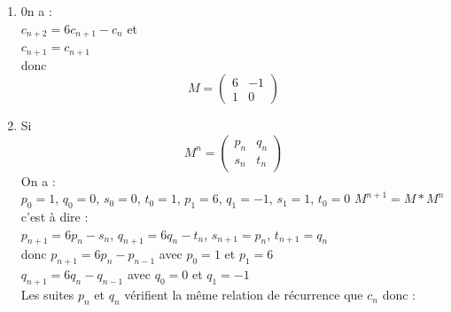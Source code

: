 \documentclass[a4paper,11pt]{book}
\begin{document}
\begin{enumerate}
On a ainsi montrer que si :\\
$s_n=${\tt [a,c]} et $s_{n+1}=${\tt a1,c1)} sont des solutions successives qui 
v\'erifient les relations de r\'ecurrence alors $s_{2n}$, $s_{2n+1}$, $s_{2n+2}$ v\'erifient aussi les relations de r\'ecurrence.\\
$s_1=[3,5]$ engendre $s_2=[20,29]$ et $s_3$.
On peut v\'erifier par le programme de la question 1 que $[3,5]$ et $[20,29]$
sont 2 solutions successives qui v\'erifie la relation de r\'ecurrence 
(29=4*3+3*5+2 et 20=3*3+2*5+1) donc on en d\'eduit par r\'ecurrence que :
si $s_2$ engendre $s_4$et $s_5$, alors $s_2,s_3,s_4$ sont des solutions 
successives qui v\'erifient la relation de r\'ecurrence....
On peut aussi faire le programme suivant qui renvoie la liste des solutions en 
utilisant les fonctions {\tt sa1, sc1, sa2, sc2} d\'efinies pr\'ec\'edemment :
\begin{verbatim}
sa1(a,c):=normal(4*c*a+2*c-2*c^2);
sc1(a,c):=normal(4*c^2-4*c*a-2*c-1);
sa2(a,c):=normal(4*c*a+2*c-1+2*c^2);
sc2(a,c):=normal(4*c^2+4*c*a+2*c-1);
tripisoc(n):={
local a,a1,a2,c,c1,c2,L,k;
L:=[0,1],[3,5];
pour k de 1 jusque n faire 
a,c:=L[k];
L:=L,[sa1(a,c),sc1(a,c)],[sa2(a,c),sc2(a,c)];
fpour;
return L;
}:;
\end{verbatim}
\item 0n a :\\
$c_{n+2}=6c_{n+1}-c_n$ et\\
$c_{n+1}=c_{n+1}$ \\
donc\\
$$ M=\left(
\begin{array}{cc}
6&-1\\
1&0
\end{array}
\right)
$$
\item Si
$$ M^n=\left(
\begin{array}{cc}
p_n&q_n\\
s_n&t_n
\end{array}
\right)
$$
On a :\\
$p_0=1$, $q_0=0$, $s_0=0$, $t_0=1$,
$p_1=6$, $q_1=-1$, $s_1=1$, $t_0=0$
$M^{n+1}=M*M^n$ c'est \`a dire :\\
$p_{n+1}=6p_n-s_n$, $q_{n+1}=6q_n-t_n$, $s_{n+1}=p_n$, $t_{n+1}=q_n$\\
donc
$p_{n+1}=6p_n-p_{n-1}$ avec $p_0=1$ et $p_1=6$\\
$q_{n+1}=6q_n-q_{n-1}$ avec $q_0=0$ et $q_1=-1$\\
Les suites $p_n$ et $q_n$ v\'erifient la m\^eme relation de r\'ecurrence que 
$c_n$ donc :\\

\end{enumerate}
\end{document}
